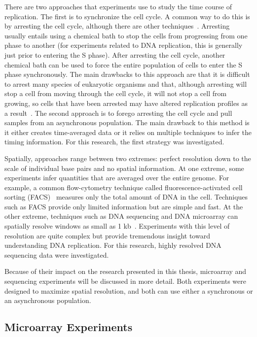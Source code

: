 	There are two approaches that experiments use to study the time course of replication.
	The first is to synchronize the cell cycle.
	A common way to do this is by arresting the cell cycle, although there are other techniques~\cite{CellCycleSynch}.
	Arresting usually entails using a chemical bath to stop the cells from progressing from one phase to another (for experiments related to DNA replication, this is generally just prior to entering the S phase).
	After arresting the cell cycle, another chemical bath can be used to force the entire population of cells to enter the S phase synchronously.
	The main drawbacks to this approach are that  it is difficult to arrest many species of eukaryotic organisms and that, although arresting will stop a cell from moving through the cell cycle, it will not stop a cell from growing, so cells that have been arrested may have altered replication profiles as a result~\cite{CellCycleSynch}.
	The second approach is to forego arresting the cell cycle and pull samples from an asynchronous population.
	The main drawback to this method is it either creates time-averaged data or it relies on multiple techniques to infer the timing information.
	For this research, the first strategy was investigated.
	
	Spatially, approaches range between two extremes: perfect resolution down to the scale of individual base pairs and no spatial information.
	At one extreme, some experiments infer quantities that are averaged over the entire genome. 
	For example, a common flow-cytometry technique called fluorescence-activated cell sorting (FACS)~\cite{DeepSeq, SequencingReview} measures only the total amount of DNA in the cell.
	Techniques such as FACS provide only limited information but are simple and fast.
	At the other extreme, techniques such as DNA sequencing and DNA microarray can spatially resolve windows as small as 1 kb~\cite{DeepSeq}.
	Experiments with this level of resolution are quite complex but provide tremendous insight toward understanding DNA replication.
	For this research, highly resolved DNA sequencing data were investigated.
	
	Because of their impact on the research presented in this thesis, microarray and sequencing experiments will be discussed in more detail.
	Both experiments were designed to maximize spatial resolution, and both can use either a synchronous or an asynchronous population.
	
	
		\subsection{Microarray Experiments}
		\label{subsec:Microarray}
		
